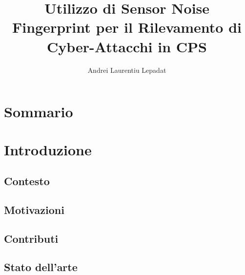 \documentclass[Lau,binding=0.6cm]{sapthesis}
\title{Utilizzo di Sensor Noise Fingerprint per il Rilevamento di Cyber-Attacchi in CPS}
\author{Andrei Laurentiu Lepadat}
\begin{document}
\frontmatter

\maketitle

\dedication{Decidere se inserire. Ne vale la pena?}


\tableofcontents

\chapter{Sommario} 


\mainmatter

\chapter{Introduzione}

\section{Contesto}

\section{Motivazioni}

\section{Contributi}

\section{Stato dell'arte}
\end{document}
